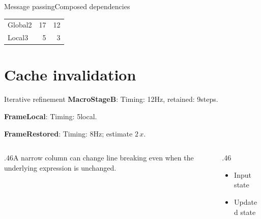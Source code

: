 \documentclass[9pt,aspectratio=43]{beamer}
\newcommand{\fuzzlayerA}[1]{\textbf{#1}}
\newcommand{\fuzzterm}[1]{\fuzzlayerA{#1}}
\newcommand{\fuzzpair}[2]{\fuzzterm{#1}: #2}
\newcommand{\fuzzunit}{steps}
\let\fuzzoriginalunit\fuzzunit
\newcommand{\fuzzcoefficient}{4}
\newcommand{\fuzzscale}[2][\fuzzcoefficient]{#1\,#2}
\begin{document}
\begin{frame}[t,shrink=5]{Message passing}{Composed dependencies}
\begin{enumerate}
\begin{description}
\begin{enumerate}
\begin{tabular}{lrr}
Global2&17&12\\
Local3&5&3\\
\end{tabular}
\end{enumerate}
\end{description}
\end{enumerate}
\par {}
\end{frame}
\renewcommand{\fuzzunit}{Hz}
\renewcommand{\fuzzcoefficient}{2}
\renewcommand{\fuzzterm}[1]{{\textbf{#1}}}
\section{Cache invalidation}
\begin{frame}[t]{Iterative refinement}
\fuzzpair{MacroStageB}{Timing: 12\fuzzunit, retained: 9\fuzzoriginalunit.}\par
{\renewcommand{\fuzzunit}{local}\fuzzpair{FrameLocal}{Timing: 5\fuzzunit.}\par}
\fuzzpair{FrameRestored}{Timing: 8\fuzzunit; estimate $\fuzzscale{x}$.}\par
\begin{columns}[T]\begin{column}{.46\textwidth}A narrow column can change line breaking even when the underlying expression is unchanged.\end{column}\begin{column}{.46\textwidth}\begin{itemize}\item Input state\item Updated state\end{itemize}\end{column}\end{columns}
\end{frame}
\renewcommand{\fuzzunit}{min}
\renewcommand{\fuzzcoefficient}{3}
\renewcommand{\fuzzterm}[1]{{\textit{#1}}}
\end{document}
